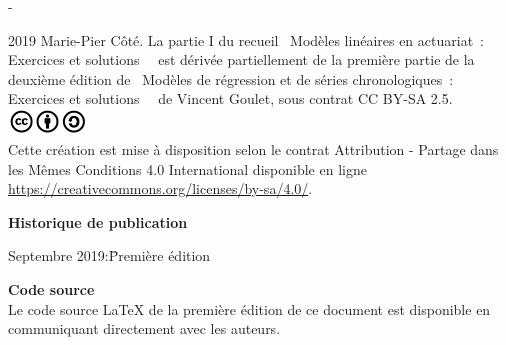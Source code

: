 \begingroup
\calccentering{\unitlength}
\begin{adjustwidth*}{\unitlength}{-\unitlength}
  \small
  \setlength{\parindent}{0pt}
  \setlength{\parskip}{\baselineskip}

  {\textcopyright} 2019 Marie-Pier Côté. La partie I du recueil \og~Modèles linéaires en actuariat~: Exercices et solutions~\fg~ est dérivée partiellement de la première partie de la deuxième édition de \og~Modèles de régression et de séries chronologiques~: Exercices et solutions~\fg~ de Vincent Goulet, sous contrat CC BY-SA 2.5. \\
  

  \includegraphics[height=7mm,keepaspectratio=true]{cc-by-sa.jpg} \\  
  Cette création est mise à disposition selon le contrat
  Attribution - Partage dans les Mêmes Conditions 4.0 International
  disponible en ligne
  \url{https://creativecommons.org/licenses/by-sa/4.0/}.


  \textbf{Historique de publication}
  \vspace{-\baselineskip}
  \begin{tabbing}
    Septembre 2019:\quad\= Première édition 
  \end{tabbing}

  \textbf{Code source} \\
  Le code source {\LaTeX} de la première édition de ce document est disponible en communiquant directement avec les auteurs.

  \vspace{1cm}

\end{adjustwidth*}
\endgroup

\renewcommand{\sfdefault}{phv}

\clearpage

